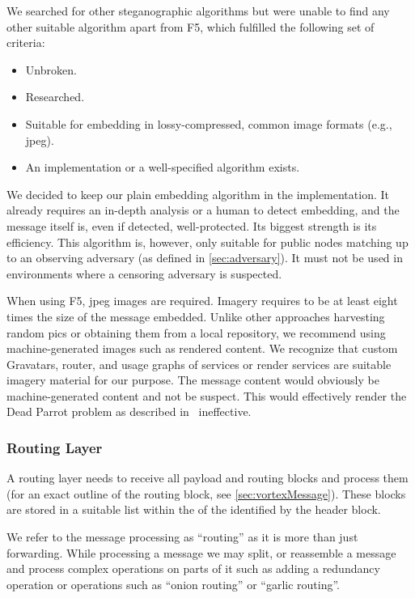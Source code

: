 We searched for other steganographic algorithms but were unable to find any other suitable algorithm apart from F5, which fulfilled the following set of criteria:
\begin{itemize}
	\item Unbroken.
	\item Researched.
	\item Suitable for embedding in lossy-compressed, common image formats (e.g., jpeg).
	\item An implementation or a well-specified algorithm exists.
\end{itemize}

We decided to keep our plain embedding algorithm in the implementation. It already requires an in-depth analysis or a human to detect embedding, and the message itself is, even if detected, well-protected. Its biggest strength is its efficiency. This algorithm is, however, only suitable for public nodes matching up to an observing adversary (as defined in \cref{sec:adversary}). It must not be used in environments where a censoring adversary is suspected.

When using F5, jpeg images are required. Imagery requires to be at least eight times the size of the message embedded. Unlike other approaches harvesting random pics or obtaining them from a local repository, we recommend using machine-generated images such as rendered content. We recognize that custom Gravatars, router, and usage graphs of services or render services are suitable imagery material for our purpose. The message content would obviously be machine-generated content and not be suspect. This would effectively render the Dead Parrot problem as described in~\cite{oakland2013-parrot} ineffective. 

\subsubsection{Routing Layer}\label{sec:routingLayer}
A routing layer needs to receive all payload and routing blocks and process them (for an exact outline of the routing block, see \cref{sec:vortexMessage}). These blocks are stored in a suitable list within the  of the  identified by the header block.

We refer to the message processing as ``routing'' as it is more than just forwarding. While processing a message we may split, or reassemble a message and process complex operations on parts of it such as adding a redundancy operation or operations such as ``onion routing'' or ``garlic routing''.

